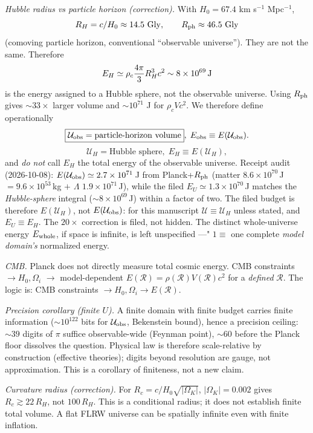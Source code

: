 \documentclass[twocolumn]{aastex631}
\begin{document}
\textit{Hubble radius vs particle horizon (correction).} With $H_{0}=67.4$ km s$^{-1}$ Mpc$^{-1}$,
\[
R_{H}=c/H_{0}\approx14.5\ {\rm Gly},\qquad R_{\rm ph}\approx46.5\ {\rm Gly}
\]
(comoving particle horizon, conventional ``observable universe''). They are not the same. Therefore
\[
E_{H}\simeq\rho_{c}\frac{4\pi}{3}R_{H}^{3}c^{2}\sim8\times10^{69}\,{\rm J}
\]
is the energy assigned to a Hubble sphere, not the observable universe. Using $R_{\rm ph}$ gives $\sim33\times$ larger volume and $\sim10^{71}$ J for $\rho_{c}Vc^{2}$. We therefore define operationally
\[
\boxed{\mathcal U_{\rm obs}=\text{particle-horizon volume}},\;
E_{\rm obs}\equiv E(\mathcal U_{\rm obs}).
\]
\[
\boxed{\mathcal U_{H}=\text{Hubble sphere}},\;
E_{H}\equiv E(\mathcal U_{H}),
\]
and \emph{do not} call $E_{H}$ the total energy of the observable universe. Receipt audit (2026-10-08): $E(\mathcal U_{\rm obs})\simeq2.7\times10^{71}$\,J from Planck+$R_{\rm ph}$ (matter $8.6\times10^{70}$\,J $=9.6\times10^{53}$\,kg $+$ $\Lambda$ $1.9\times10^{71}$\,J), while the filed $E_{U}\simeq1.3\times10^{70}$\,J matches the \emph{Hubble-sphere} integral ($\sim8\times10^{69}$\,J) within a factor of two. The filed budget is therefore $E(\mathcal U_{H})$, not $E(\mathcal U_{\rm obs})$: for this manuscript $\mathcal U\equiv\mathcal U_{H}$ unless stated, and $E_{U}\equiv E_{H}$. The $20\times$ correction is filed, not hidden. The distinct whole-universe energy $E_{\rm whole}$, if space is infinite, is left unspecified ---" $1\equiv$ one complete \emph{model domain's} normalized energy.

\textit{CMB.} Planck does not directly measure total cosmic energy. CMB constraints $\to H_{0},\Omega_{i}$ $\to$ model-dependent $E(\mathcal R)=\rho(\mathcal R)V(\mathcal R)c^{2}$ for a \emph{defined} $\mathcal R$. The logic is: CMB constraints $\to H_{0},\Omega_{i}\to E(\mathcal R)$.

\textit{Precision corollary (finite $U$).} A finite domain with finite budget carries finite information ($\sim10^{122}$ bits for $\mathcal U_{\rm obs}$, Bekenstein bound), hence a precision ceiling: $\sim39$ digits of $\pi$ suffice observable-wide (Feynman point), $\sim60$ before the Planck floor dissolves the question. Physical law is therefore scale-relative by construction (effective theories); digits beyond resolution are gauge, not approximation. This is a corollary of finiteness, not a new claim.

\textit{Curvature radius (correction).} For $R_{c}=c/H_{0}\sqrt{|\Omega_{K}|}$, $|\Omega_{K}|=0.002$ gives $R_{c}\gtrsim22\,R_{H}$, not $100\,R_{H}$. This is a conditional radius; it does not establish finite total volume. A flat FLRW universe can be spatially infinite even with finite inflation.
\end{document}
